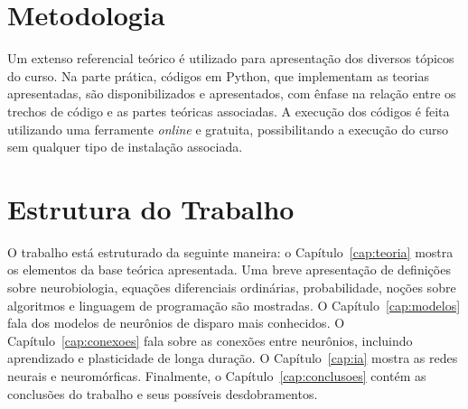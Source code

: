 \section{Metodologia}
Um extenso referencial teórico é utilizado para apresentação dos diversos tópicos do curso. Na parte prática, códigos em Python, que implementam as teorias apresentadas, são disponibilizados e apresentados, com ênfase na relação entre os trechos de código e as partes teóricas associadas. A execução dos códigos é feita utilizando uma ferramente \textit{online} e gratuita, possibilitando a execução do curso sem qualquer tipo de instalação associada.

\section{Estrutura do Trabalho}
O trabalho está estruturado da seguinte maneira: o Capítulo~\ref{cap:teoria} mostra os elementos da base teórica apresentada. Uma breve apresentação de definições sobre neurobiologia, equações diferenciais ordinárias, probabilidade, noções sobre algoritmos e linguagem de programação são mostradas. O Capítulo~\ref{cap:modelos} fala dos modelos de neurônios de disparo mais conhecidos. O Capítulo~\ref{cap:conexoes} fala sobre as conexões entre neurônios, incluindo aprendizado e plasticidade de longa duração. O Capítulo~\ref{cap:ia} mostra as redes neurais e neuromórficas. Finalmente, o Capítulo~\ref{cap:conclusoes} contém as conclusões do trabalho e seus possíveis desdobramentos.
